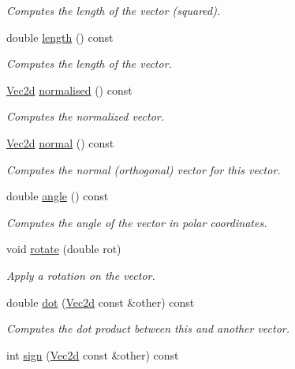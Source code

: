 \begin{DoxyCompactItemize}
\begin{DoxyCompactList}\small\item\em Computes the length of the vector (squared). \end{DoxyCompactList}\item 
double \hyperlink{class_vec2d_a3cd409b86defacc52595bca6dc913354}{length} () const 
\begin{DoxyCompactList}\small\item\em Computes the length of the vector. \end{DoxyCompactList}\item 
\hyperlink{class_vec2d}{Vec2d} \hyperlink{class_vec2d_a319900dc63bc0b224b3ee38348e204ac}{normalised} () const 
\begin{DoxyCompactList}\small\item\em Computes the normalized vector. \end{DoxyCompactList}\item 
\hyperlink{class_vec2d}{Vec2d} \hyperlink{class_vec2d_ace09372a527bac00ab500def7faa5ad8}{normal} () const 
\begin{DoxyCompactList}\small\item\em Computes the normal (orthogonal) vector for this vector. \end{DoxyCompactList}\item 
double \hyperlink{class_vec2d_a84894d859870194a169ad00300fb9405}{angle} () const 
\begin{DoxyCompactList}\small\item\em Computes the angle of the vector in polar coordinates. \end{DoxyCompactList}\item 
void \hyperlink{class_vec2d_a3444a6ab8f15cb3b826745cb7b2ea610}{rotate} (double rot)
\begin{DoxyCompactList}\small\item\em Apply a rotation on the vector. \end{DoxyCompactList}\item 
double \hyperlink{class_vec2d_a4fbf3390344e2a3c8c58d8c63e128505}{dot} (\hyperlink{class_vec2d}{Vec2d} const \&other) const 
\begin{DoxyCompactList}\small\item\em Computes the dot product between this and another vector. \end{DoxyCompactList}\item 
int \hyperlink{class_vec2d_a9a70c8679968b6f92ca21214b19a0e79}{sign} (\hyperlink{class_vec2d}{Vec2d} const \&other) const 

\end{DoxyCompactItemize}
